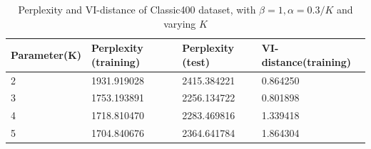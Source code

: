 \documentclass{article} %
\begin{document}
\begin{table}
\centering
    \begin{tabular}{|l|l|l|l|}
    \hline
    Parameter(K) & Perplexity (training) & Perplexity (test) & VI-distance(training) \\ \hline
    2            & 1931.919028                     & 2415.384221                 & 0.864250                     \\ \hline
    3            & 1753.193891           & 2256.134722       & 0.801898              \\ \hline
    4            & 1718.810470           & 2283.469816       & 1.339418              \\ \hline
    5            & 1704.840676           & 2364.641784       & 1.864304              \\ \hline
    \end{tabular}
    \caption{Perplexity and VI-distance of Classic400 dataset, with $\beta= 1,  \alpha = 0.3/K$ and varying $K$}
\label{table2}
\end{table}
\end{document}
